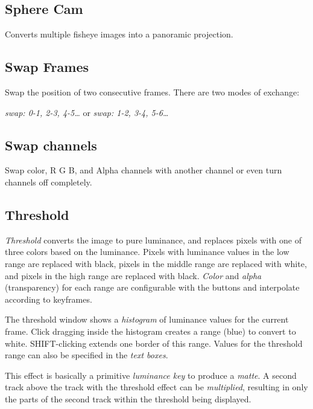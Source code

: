 \subsection{Sphere Cam}%
\label{sub:sphere_cam}

Converts multiple fisheye images into a panoramic projection.

\subsection{Swap Frames}%
\label{sub:swap_frames}

Swap the position of two consecutive frames. There are two modes of exchange:

\qquad \textit{swap: 0-1, 2-3, 4-5\dots} \qquad or \qquad \textit{swap: 1-2, 3-4, 5-6\dots}

\subsection{Swap channels}%
\label{sub:swap_channels}

Swap color, R G B, and Alpha channels with another channel or even turn channels off completely.

\subsection{Threshold}%
\label{sub:threshold}

\textit{Threshold} converts the image to pure luminance, and replaces pixels with one of three colors based on the luminance. Pixels with luminance values in the low range are replaced with black, pixels in the middle range are replaced with white, and pixels in the high range are replaced with black. \textit{Color} and \textit{alpha} (transparency) for each range are configurable with the buttons and interpolate according to keyframes.

The threshold window shows a \textit{histogram} of luminance values for the current frame. Click dragging inside the histogram creates a range (blue) to convert to white. SHIFT-clicking extends one border of this range. Values for the threshold range can also be specified in the \textit{text boxes}.

This effect is basically a primitive \textit{luminance key} to produce a \textit{matte}. A second track above the track with the threshold effect can be \textit{multiplied}, resulting in only the parts of the second track within the threshold being displayed.

